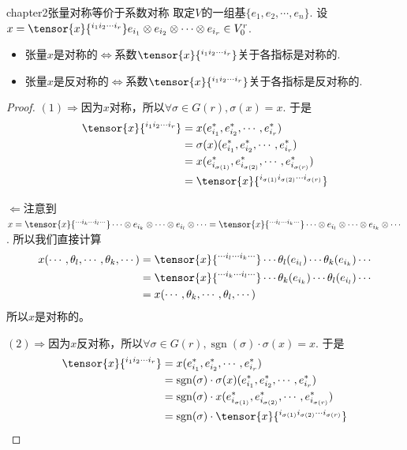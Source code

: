 \begin{mythm}{}{chapter2张量对称等价于系数对称}
取定$V$的一组基$\{e_{1} ,e_{2},\cdots,e_{n}\}$. 设$x=\tensor{x}{^{i_{1}i_{2}\cdots i_{r}}}e_{i_{1}}\otimes e_{i_{2}}\otimes \cdots \otimes e_{i_{r}}\in V^{r}_{0}$.
\begin{itemize}
\item[(1)] 张量$x$是对称的$\Leftrightarrow$系数$\tensor{x}{^{i_{1}i_{2}\cdots i_{r}}}$关于各指标是对称的.
\item[(2)] 张量$x$是反对称的$\Leftrightarrow$系数$\tensor{x}{^{i_{1}i_{2}\cdots i_{r}}}$关于各指标是反对称的.
\end{itemize}
\end{mythm}
\begin{proof}
$(1)\Rightarrow$因为$x$对称，所以$\forall \sigma\in G(r),\sigma(x)=x$. 于是
\[
\begin{split}
\tensor{x}{^{i_{1}i_{2}\cdots i_{r}}}&=x(e^{\ast}_{i_{1}},e^{\ast}_{i_{2}},\cdots,e^{\ast}_{i_{r}})\\
&= \sigma(x)(e^{\ast}_{i_{1}},e^{\ast}_{i_{2}},\cdots,e^{\ast}_{i_{r}})\\
&= x(e^{\ast}_{i_{\sigma(1)}},e^{\ast}_{i_{\sigma(2)}},\cdots,e^{\ast}_{i_{\sigma(r)}})\\
&= \tensor{x}{^{i_{\sigma(1)}i_{\sigma(2)}\cdots i_{\sigma(r)}}}
\end{split}
\]

$\Leftarrow$注意到$x=\tensor{x}{^{\cdots i_{k}\cdots i_{l}\cdots }}\cdots \otimes e_{i_{k}}\otimes \cdots\otimes e_{i_{l}}\otimes\cdots=\tensor{x}{^{\cdots i_{l}\cdots i_{k}\cdots }}\cdots \otimes e_{i_{l}}\otimes \cdots\otimes e_{i_{k}}\otimes\cdots$.
所以我们直接计算
\[
\begin{split}
	x(\cdots,\theta_{l},\cdots,\theta_{k},\cdots)&=\tensor{x}{^{\cdots i_{l}\cdots i_{k}\cdots }}\cdots\theta_{l}(e_{i_{l}})\cdots\theta_{k}(e_{i_{k}})\cdots\\
&=\tensor{x}{^{\cdots i_{k}\cdots i_{l}\cdots }}\cdots  \theta_{k}(e_{i_{k}}) \cdots \theta_{l}(e_{i_{l}})\cdots\\
&=x(\cdots,\theta_{k},\cdots,\theta_{l},\cdots)
\end{split}
\]
所以$x$是对称的。

$(2)\Rightarrow$因为$x$反对称，所以$\forall \sigma\in G(r),\operatorname{sgn}(\sigma) \cdot \sigma(x)=x$. 于是
\[
\begin{split}
\tensor{x}{^{i_{1}i_{2}\cdots i_{r}}}&=x(e^{\ast}_{i_{1}},e^{\ast}_{i_{2}},\cdots,e^{\ast}_{i_{r}})\\
&=\operatorname{sgn}(\sigma) \cdot \sigma(x)(e^{\ast}_{i_{1}},e^{\ast}_{i_{2}},\cdots,e^{\ast}_{i_{r}})\\
&= \operatorname{sgn}(\sigma) \cdot x(e^{\ast}_{i_{\sigma(1)}},e^{\ast}_{i_{\sigma(2)}},\cdots,e^{\ast}_{i_{\sigma(r)}})\\
&=\operatorname{sgn}(\sigma) \cdot \tensor{x}{^{i_{\sigma(1)}i_{\sigma(2)}\cdots i_{\sigma(r)}}}
\end{split}
\]


\end{proof}
